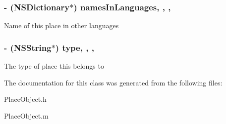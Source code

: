 \subsubsection[{\texorpdfstring{names\+In\+Languages}{namesInLanguages}}]{\setlength{\rightskip}{0pt plus 5cm}-\/ (N\+S\+Dictionary$\ast$) names\+In\+Languages\hspace{0.3cm}{\ttfamily [read]}, {\ttfamily [write]}, {\ttfamily [nonatomic]}, {\ttfamily [retain]}}\hypertarget{interface_place_object_a29458bf7d479735b009bb5f3d72b24e5}{}\label{interface_place_object_a29458bf7d479735b009bb5f3d72b24e5}
Name of this place in other languages 
\subsubsection[{\texorpdfstring{type}{type}}]{\setlength{\rightskip}{0pt plus 5cm}-\/ (N\+S\+String$\ast$) type\hspace{0.3cm}{\ttfamily [read]}, {\ttfamily [write]}, {\ttfamily [nonatomic]}, {\ttfamily [retain]}}\hypertarget{interface_place_object_a4d1924fc2fb84097f452f47f66199661}{}\label{interface_place_object_a4d1924fc2fb84097f452f47f66199661}
The type of place this belongs to 

The documentation for this class was generated from the following files\+:\begin{DoxyCompactItemize}
\item 
Place\+Object.\+h\item 
Place\+Object.\+m\end{DoxyCompactItemize}
